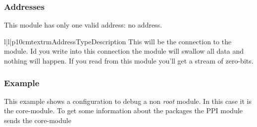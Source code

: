 \subsubsection{Addresses}
This module has only one valid address: no address.
\begin{tableiii}{l|l|p{10cm}}{textrm}{Address}{Type}{Description}
\lineiii{---}
        {}
        {This will be the connection to the  module. Id you
         write into this connection the module will swallow all data and
         nothing will happen. If you read from this module you'll get a 
         stream of zero-bits.}
\end{tableiii}

\subsubsection{Example}
This example shows a configuration to debug a non \emph{root} module. In this 
case it is the  core-module. To get some 
information about the packages the PPI module sends the core-module 
